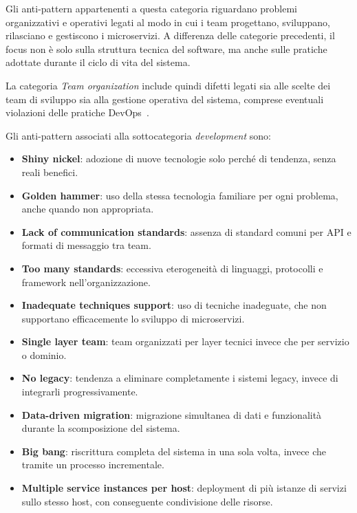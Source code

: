 Gli anti-pattern appartenenti a questa categoria riguardano problemi organizzativi e operativi legati al modo in cui i team progettano, sviluppano, rilasciano e gestiscono i microservizi. A differenza delle categorie precedenti, il focus non è solo sulla struttura tecnica del software, ma anche sulle pratiche adottate durante il ciclo di vita del sistema.

La categoria \textit{Team organization} include quindi difetti legati sia alle scelte dei team di sviluppo sia alla gestione operativa del sistema, comprese eventuali violazioni delle pratiche DevOps~\cite{CernyCatalogo}.

Gli anti-pattern associati alla sottocategoria \textit{development} sono:
\begin{itemize}
  \item \textbf{Shiny nickel}: adozione di nuove tecnologie solo perché di tendenza, senza reali benefici.
  \item \textbf{Golden hammer}: uso della stessa tecnologia familiare per ogni problema, anche quando non appropriata.
  \item \textbf{Lack of communication standards}: assenza di standard comuni per API e formati di messaggio tra team.
  \item \textbf{Too many standards}: eccessiva eterogeneità di linguaggi, protocolli e framework nell’organizzazione.
  \item \textbf{Inadequate techniques support}: uso di tecniche inadeguate, che non supportano efficacemente lo sviluppo di microservizi.
  \item \textbf{Single layer team}: team organizzati per layer tecnici invece che per servizio o dominio.
  \item \textbf{No legacy}: tendenza a eliminare completamente i sistemi legacy, invece di integrarli progressivamente.
  \item \textbf{Data-driven migration}: migrazione simultanea di dati e funzionalità durante la scomposizione del sistema.
  \item \textbf{Big bang}: riscrittura completa del sistema in una sola volta, invece che tramite un processo incrementale.
  \item \textbf{Multiple service instances per host}: deployment di più istanze di servizi sullo stesso host, con conseguente condivisione delle risorse.
\end{itemize}

